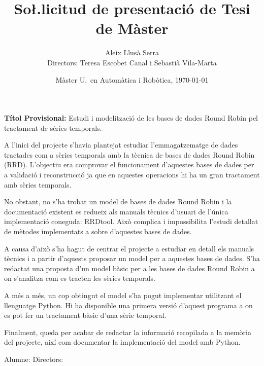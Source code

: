 \documentclass[a4paper,12pt,oneside,catalan]{article}
\begin{document}
\title{So\l.licitud de presentació de Tesi de Màster}
\author{Aleix Llusà Serra\\
Directors: Teresa Escobet Canal i Sebastià Vila-Marta}
\date{Màster U.\ en Automàtica i Robòtica, \today}

\maketitle

\thispagestyle{empty}

{\bfseries Títol Provisional:} Estudi i modelització de les bases de dades Round Robin pel tractament de sèries temporals.



A l'inici del projecte s'havia plantejat estudiar l'emmagatzematge de dades tractades com a sèries temporals amb la tècnica de bases de dades Round Robin (RRD). L'objectiu era comprovar el funcionament d'aquestes bases de dades per a validació i reconstrucció ja que en aquestes operacions hi ha un gran tractament amb sèries temporals.

No obstant, no s'ha trobat un model de bases de dades Round Robin i la documentació existent es redueix als manuals tècnics d'usuari de l'única implementació coneguda: RRDtool. Això complica i impossibilita l'estudi detallat de mètodes implementats a sobre d'aquestes bases de dades.

A causa d'això s'ha hagut de centrar el projecte a estudiar en detall els manuals tècnics i a partir d'aquests proposar un model per a aquestes bases de dades. S'ha redactat una proposta d'un model bàsic per a les bases de dades Round Robin a on s'analitza com es tracten les sèries temporals.

A més a més, un cop obtingut el model s'ha pogut implementar utilitzant el llenguatge Python. Hi ha disponible una primera versió d'aquest programa a on es pot fer un tractament bàsic d'una sèrie temporal.

Finalment, queda per acabar de redactar la informació recopilada a la memòria del projecte, així com documentar la implementació del model amb Python.
 
\vspace{2cm}

Alumne: \hfill Directors: \hfill \mbox{}
\end{document}
